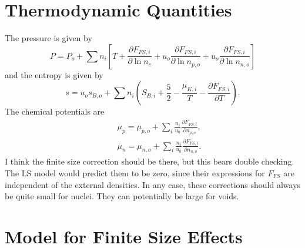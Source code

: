 \documentclass[11pt,letter]{article}
\begin{document}
\section{Thermodynamic Quantities} 
The pressure is given by 
\begin{equation}
P = P_o + \sum n_i \left[ T + \frac{\partial F_{FS,i}}{\partial \ln n_e} 
+ u_o \frac{\partial F_{FS,i}}{\partial \ln n_{p,o}} 
+ u_o \frac{\partial F_{FS,i}}{\partial \ln n_{n,o}} \right]  
\end{equation}
and the entropy is given by 
\begin{equation}
s = u_o s_{B,o} + \sum n_i \left(S_{B,i} + \frac{5}{2} - \frac{\mu_{K,i}}{T} 
- \frac{\partial F_{FS,i}}{\partial T}\right).
\end{equation}
The chemical potentials are 
\begin{eqnarray}
&& \mu_p = \mu_{p,o} + \sum_i \frac{n_i}{u_0} \frac{\partial F_{FS,i}}{\partial n_{p,o}}, \\
&& \mu_n = \mu_{n,o} + \sum_i \frac{n_i}{u_0} \frac{\partial F_{FS,i}}{\partial n_{n,o}}.
\end{eqnarray}
I think the finite size correction should be there, but this bears double
checking.  The LS model would predict them to be zero, since their expressions for
$F_{FS}$ are independent of the external densities.  In any case, these 
corrections should always be quite small for nuclei.  They can potentially be 
large for voids.

\section{Model for Finite Size Effects}
\end{document}
